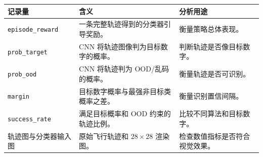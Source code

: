 \begin{tabular}{p{3.0cm}p{5.0cm}p{4.0cm}}
\toprule
记录量 & 含义 & 分析用途 \\
\midrule
\texttt{episode\_reward} & 一条完整轨迹得到的分类器引导奖励。 & 衡量策略总体表现。\\
\texttt{prob\_target} & CNN 将轨迹图像判为目标数字的概率。 & 判断轨迹是否像目标数字。\\
\texttt{prob\_ood} & CNN 将轨迹判为 OOD/乱码的概率。 & 衡量轨迹是否可识别。\\
\texttt{margin} & 目标数字概率与最强非目标类概率之差。 & 衡量识别置信间隔。\\
\texttt{success\_rate} & 满足目标概率和 OOD 约束的轨迹比例。 & 比较不同算法和目标数字。\\
轨迹图与分类器输入图 & 原始飞行轨迹和 $28\times28$ 渲染图。 & 检查数值指标是否符合视觉效果。\\
\bottomrule
\end{tabular}
